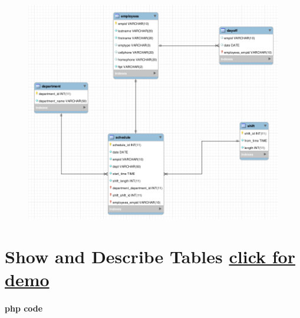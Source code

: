 \documentclass[11pt]{article}
\makeatletter
\def\maxwidth{\ifdim\Gin@nat@width>\linewidth\linewidth
    \else\Gin@nat@width\fi}
\let\Oldincludegraphics\includegraphics
\renewcommand{\includegraphics}[1]{\Oldincludegraphics[width=.8\maxwidth]{#1}}
\makeatother
\begin{document}
    \begin{figure}[H]
\centering
\includegraphics{1.png}
\caption{}
\end{figure}

    \section*{\texorpdfstring{Show and Describe Tables
\href{http://cs431project-jxy225.herokuapp.com/view/main.php}{click for
demo}}{Show and Describe Tables click for demo}}\label{show-and-describe-tables-click-for-demo}

    \paragraph{php code}\label{php-code}
\end{document}

